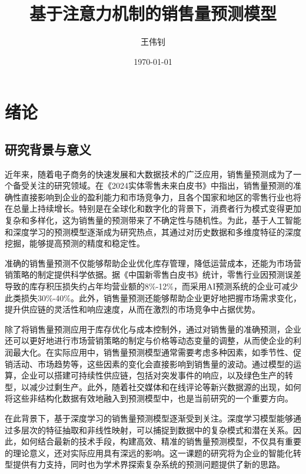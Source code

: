\documentclass[12pt]{article}
\title{基于注意力机制的销售量预测模型}
\author{王伟钊}
\date{\today}
\begin{document}
\maketitle

\begin{abstract}
    
\end{abstract}

\newpage

\tableofcontents

\newpage

\section{绪论}

\subsection{研究背景与意义}
近年来，随着电子商务的快速发展和大数据技术的广泛应用，销售量预测成为了一个备受关注的研究领域。在《2024实体零售未来白皮书》中指出，销售量预测的准确性直接影响到企业的盈利能力和市场竞争力\cite{Hanshuo2024}，且各个国家和地区的零售行业也将在总量上持续增长。特别是在全球化和数字化的背景下，消费者行为模式变得更加复杂和多样化，这为销售量的预测带来了不确定性与随机性。为此，基于人工智能和深度学习的预测模型逐渐成为研究热点，其通过对历史数据和多维度特征的深度挖掘，能够提高预测的精度和稳定性。

准确的销售量预测不仅能够帮助企业优化库存管理，降低运营成本，还能为市场营销策略的制定提供科学依据。据《中国新零售白皮书》统计\cite{hurun2023}，零售行业因预测误差导致的库存积压损失约占年均营业额的8\%-12\%，而采用AI预测系统的企业可减少此类损失30\%-40\%。此外，销售量预测还能够帮助企业更好地把握市场需求变化，提升供应链的灵活性和响应速度，从而在激烈的市场竞争中占据优势。

除了将销售量预测应用于库存优化与成本控制外，通过对销售量的准确预测，企业还可以更好地进行市场营销策略的制定与价格等动态变量的调整，从而使企业的利润最大化。在实际应用中，销售量预测模型通常需要考虑多种因素，如季节性、促销活动、市场趋势等，这些因素的变化会直接影响到销售量的波动。通过模型的运算，企业可以搭建可持续性供应链，包括对突发事件的响应，以及绿色生产的转型，以减少过剩生产。此外，随着社交媒体和在线评论等新兴数据源的出现，如何将这些非结构化数据有效地融入到预测模型中，也是当前研究的一个重要方向。

在此背景下，基于深度学习的销售量预测模型逐渐受到关注。深度学习模型能够通过多层次的特征抽取和非线性映射，可以捕捉到数据中的复杂模式和潜在关系。因此，如何结合最新的技术手段，构建高效、精准的销售量预测模型，不仅具有重要的理论意义，还对实际应用具有深远的影响。这一课题的研究将为企业的智能化转型提供有力支持，同时也为学术界探索复杂系统的预测问题提供了新的思路。
\end{document}
